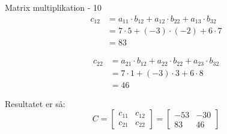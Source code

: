 \documentclass{article}
\begin{document}
\begin{exercise}{Matrix multiplikation - 10}
	\hint
	\begin{align*}
		c_{12} & = a_{11} \cdot b_{12} + a_{12} \cdot b_{22} + a_{13} \cdot b_{32}  \\
		& = 7 \cdot 5 + (-3) \cdot (-2) + 6 \cdot 7 \\
		& = 83
	\end{align*}
	
	\hint
	\begin{align*}
		c_{22} & = a_{21} \cdot b_{12} + a_{22} \cdot b_{22} + a_{23} \cdot b_{32}\\
		& = 7 \cdot 1 + (-3) \cdot 3 + 6 \cdot 8 \\
		& = 46
	\end{align*}
	
	
	\hint
	Resultatet er så:
	\[
	C = \left[\begin{array}{rr}
	c_{11} & c_{12} \\
	c_{21} & c_{22} 
	\end{array} \right] = 
	\left[\begin{array}{rr}
	-53 & -30 \\
	83 & 46 
	\end{array} \right]
	\]
	
	
\end{exercise}


\newpage


\end{document}
